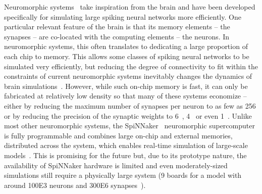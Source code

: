 \documentclass[9pt,a4paper]{amsart}
\begin{document}
Neuromorphic systems~\citep{Frenkel2018,Furber2014,Merolla2014,Qiao2015,Schemmel2017} take inspiration from the brain and have been developed specifically for simulating large spiking neural networks more efficiently.
One particular relevant feature of the brain is that its memory elements -- the synapses -- are co-located with the computing elements -- the neurons.
In neuromorphic systems, this often translates to dedicating a large proportion of each chip to memory.
This allows some classes of spiking neural networks to be simulated very efficiently, but reducing the degree of connectivity to fit within the constraints of current neuromorphic systems inevitably changes the dynamics of brain simulations~\citep{VanAlbada2015}.
However, while such on-chip memory is fast, it can only be fabricated at relatively low density so that many of these systems economize -- either by reducing the maximum number of synapses per neuron to as few as \num{256} or by reducing the precision of the synaptic weights to \SI{6}{\bit}~\citep{Schemmel2017}, \SI{4}{\bit}~\citep{Frenkel2018} or even \SI{1}{\bit}~\citep{Merolla2014}.
Unlike most other neuromorphic systems, the SpiNNaker~\citep{Furber2014} neuromorphic supercomputer is fully programmable and combines large on-chip and external memories, distributed across the system, which enables real-time simulation of large-scale models~\citep{Rhodes2019}.
This is promising for the future but, due to its prototype nature, the availability of SpiNNaker hardware is limited and even moderately-sized simulations still require a physically large system (9 boards for a model with around \num{100E3} neurons and \num{300E6} synapses~\citep{Rhodes2019}).
\end{document}
